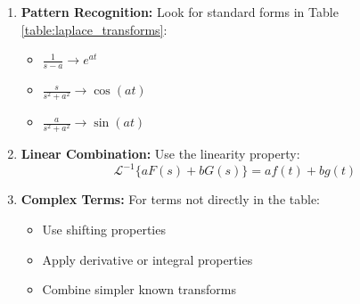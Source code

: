 \begin{enumerate}
\item \textbf{Pattern Recognition:} Look for standard forms in Table \ref{table:laplace_transforms}:
  \begin{itemize}
  \item \(\frac{1}{s-a} \rightarrow e^{at}\)
  \item \(\frac{s}{s^2 + a^2} \rightarrow \cos(at)\)
  \item \(\frac{a}{s^2 + a^2} \rightarrow \sin(at)\)
  \end{itemize}

\item \textbf{Linear Combination:} Use the linearity property:
  \[\mathcal{L}^{-1}\{aF(s) + bG(s)\} = af(t) + bg(t)\]

\item \textbf{Complex Terms:} For terms not directly in the table:
  \begin{itemize}
  \item Use shifting properties
  \item Apply derivative or integral properties
  \item Combine simpler known transforms
  \end{itemize}
\end{enumerate}

